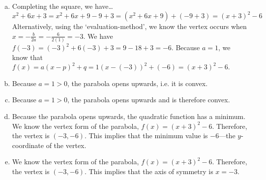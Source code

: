 \documentclass[11pt,letterpaper]{article}
\begin{document}
\sol
\begin{enumerate}[(a)]
\item Completing the square, we have\dots
	\[
	x^2 + 6x + 3= x^2 + 6x + 9 - 9 + 3= (x^2 + 6x + 9) + (-9 + 3)= (x + 3)^2 - 6
	\]
Alternatively, using the `evaluation-method', we know the vertex occurs when $x= -\frac{b}{2a}= -\frac{6}{2(1)}= -3$. We have $f(-3)= (-3)^2 + 6(-3) + 3= 9 - 18 + 3= -6$. Because $a= 1$, we know that $f(x)= a(x - p)^2 + q= 1(x - (-3))^2 + (-6)= (x + 3)^2 - 6$. \pspace

\item Because $a= 1 > 0$, the parabola opens upwards, i.e. it is convex. \pspace

\item Because $a= 1 > 0$, the parabola opens upwards and is therefore convex. \pspace

\item  Because the parabola opens upwards, the quadratic function has a minimum. We know the vertex form of the parabola, $f(x)= (x + 3)^2 - 6$. Therefore, the vertex is $(-3, -6)$. This implies that the minimum value is $-6$---the $y$-coordinate of the vertex. \pspace

\item We know the vertex form of the parabola, $f(x)= (x + 3)^2 - 6$. Therefore, the vertex is $(-3, -6)$. This implies that the axis of symmetry is $x= -3$. 
\end{enumerate}
\end{document}
